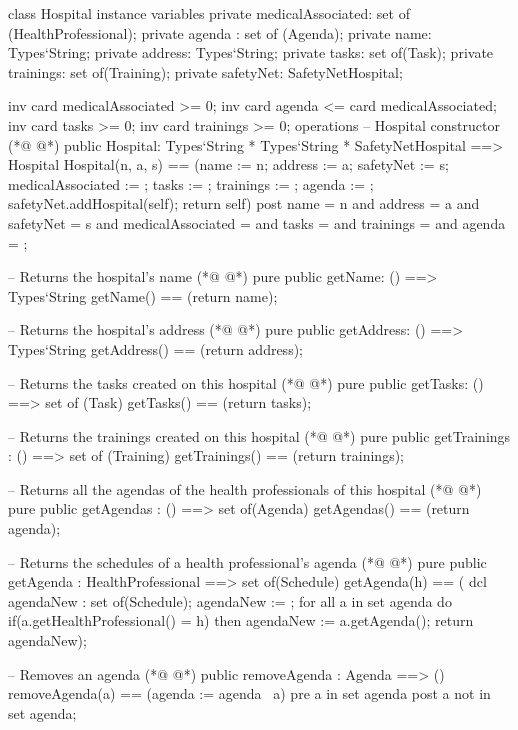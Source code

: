 \begin{vdmpp}[breaklines=true]
class Hospital
instance variables
  private medicalAssociated: set of (HealthProfessional);
  private agenda : set of (Agenda);
  private name: Types`String;
  private address: Types`String;
  private tasks: set of(Task);
  private trainings: set of(Training);
  private safetyNet: SafetyNetHospital;
 
 inv card medicalAssociated >= 0;
 inv card agenda <= card medicalAssociated;
 inv card tasks >= 0;
 inv card trainings >= 0;
operations
 -- Hospital constructor
(*@
\label{Hospital:17}
@*)
 public Hospital: Types`String * Types`String * SafetyNetHospital ==> Hospital
  Hospital(n, a, s) == (name := n; address := a; safetyNet := s; medicalAssociated := {}; tasks := {}; trainings := {}; agenda := {};
  safetyNet.addHospital(self); return self)
 post name = n and address = a and safetyNet = s and medicalAssociated = {} and tasks = {} and trainings = {} and agenda = {};
 
 -- Returns the hospital's name
(*@
\label{getName:23}
@*)
 pure public getName: () ==> Types`String
  getName() == (return name);
  
 -- Returns the hospital's address
(*@
\label{getAddress:27}
@*)
 pure public getAddress: () ==> Types`String
  getAddress() == (return address);
 
 -- Returns the tasks created on this hospital
(*@
\label{getTasks:31}
@*)
 pure public getTasks: () ==> set of (Task)
  getTasks() == (return tasks);
 
 -- Returns the trainings created on this hospital
(*@
\label{getTrainings:35}
@*)
 pure public getTrainings : () ==> set of (Training)
  getTrainings() == (return trainings);
 
 -- Returns all the agendas of the health professionals of this hospital
(*@
\label{getAgendas:39}
@*)
 pure public getAgendas : () ==> set of(Agenda)
  getAgendas() == (return agenda);
 
 -- Returns the schedules of a health professional's agenda
(*@
\label{getAgenda:43}
@*)
 pure public getAgenda : HealthProfessional ==> set of(Schedule)
  getAgenda(h) == (
   dcl agendaNew : set of(Schedule);
   agendaNew := {};
   for all a in set agenda do
    if(a.getHealthProfessional() = h)
     then agendaNew := a.getAgenda();
   return agendaNew);
 
 -- Removes an agenda
(*@
\label{removeAgenda:53}
@*)
 public removeAgenda : Agenda ==> ()
  removeAgenda(a) == (agenda := agenda \ {a})
 pre a in set agenda
 post a not in set agenda;
 

\end{vdmpp}
